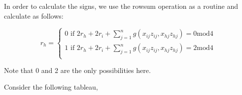 In order to calculate the signs, we use the rowsum operation as a routine and calculate as follows:

\begin{equation}
	r_h=
	\begin{cases}
		0 \text{ if } 2r_h + 2r_i + \sum_{j=1}^{n} g(x_{ij} z_{ij}, x_{hj} z_{hj})= 0 \text{mod}4\\
		1 \text{ if } 2r_h + 2r_i + \sum_{j=1}^{n} g(x_{ij} z_{ij}, x_{hj} z_{hj})= 2 \text{mod}4\\
	\end{cases}
\end{equation}

Note that 0 and 2 are the only possibilities here.	



\begin{example}
	Consider the following tableau,
	

\end{example}
